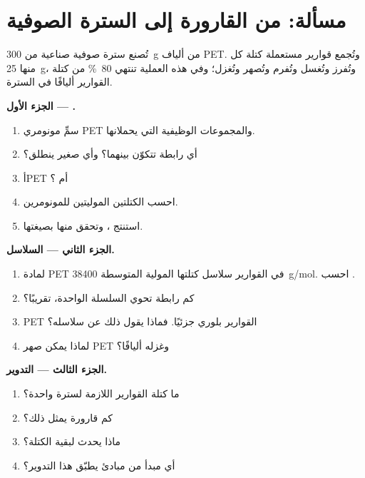 \section{مسألة: من القارورة إلى السترة الصوفية}

\begin{problem}
\label{pb:g12:polymers:1}
تُصنع سترة صوفية صناعية من \qty{300}{g} من ألياف PET. وتُجمع قوارير مستعملة
كتلة كل منها \qty{25}{g}، وتُفرز وتُغسل وتُفرم وتُصهر وتُغزل؛
وفي هذه العملية تنتهي \qty{80}{\percent} من كتلة القوارير أليافًا
في السترة.

\medskip
\noindent\textbf{الجزء الأول --- .}
\begin{enumerate}
  \item سمِّ مونومري PET والمجموعات الوظيفية التي
        يحملانها.
  \item أي رابطة تتكوّن بينهما؟ وأي  صغير ينطلق؟
  \item أPET  أم ؟
  \item احسب الكتلتين الموليتين للمونومرين.
  \item استنتج   ، وتحقق
        منها بصيغتها.
\end{enumerate}

\medskip
\noindent\textbf{الجزء الثاني --- السلاسل.}
\begin{enumerate}[resume]
  \item لمادة PET في القوارير سلاسل كتلتها المولية المتوسطة
        \qty{38400}{g/mol}. احسب .
  \item كم رابطة  تحوي السلسلة الواحدة، تقريبًا؟
  \item PET القوارير بلوري جزئيًا. فماذا يقول ذلك عن
        سلاسله؟
  \item لماذا يمكن صهر PET وغزله أليافًا؟
\end{enumerate}

\medskip
\noindent\textbf{الجزء الثالث --- التدوير.}
\begin{enumerate}[resume]
  \item ما كتلة القوارير اللازمة لسترة واحدة؟
  \item كم قارورة يمثل ذلك؟
  \item ماذا يحدث لبقية الكتلة؟
  \item أي مبدأ من مبادئ  يطبّق هذا التدوير؟
\end{enumerate}


\end{problem}
